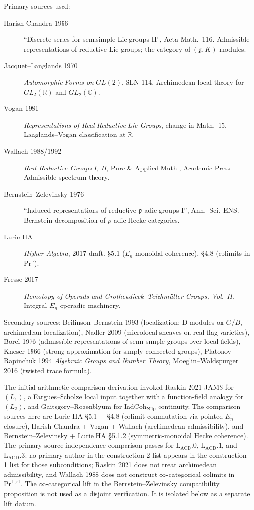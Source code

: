Primary sources used:
\begin{description}
\item[Harish-Chandra 1966] ``Discrete series for semisimple Lie
groups II'', Acta Math.\ 116. Admissible representations of
reductive Lie groups; the category of \((\mathfrak{g}, K)\)-modules.
\item[Jacquet--Langlands 1970] \emph{Automorphic Forms on \(GL(2)\)},
SLN 114. Archimedean local theory for \(GL_{2}(\mathbb{R})\) and
\(GL_{2}(\mathbb{C})\).
\item[Vogan 1981] \emph{Representations of Real Reductive Lie
Groups}, change in Math.\ 15. Langlands--Vogan classification at
\(\mathbb{R}\).
\item[Wallach 1988/1992] \emph{Real Reductive Groups I, II}, Pure
\& Applied Math., Academic Press. Admissible spectrum theory.
\item[Bernstein--Zelevinsky 1976] ``Induced representations of
reductive \(\mathfrak{p}\)-adic groups I'', Ann.\ Sci.\ ENS.
Bernstein decomposition of \(p\)-adic Hecke categories.
\item[Lurie HA] \emph{Higher Algebra}, 2017 draft. \S5.1 (\(E_{n}\)
monoidal coherence), \S4.8 (colimits in \(\mathrm{Pr}^{\mathrm{L}}\)).
\item[Fresse 2017] \emph{Homotopy of Operads and Grothendieck--Teichm\"uller
Groups, Vol.\ II}. Integral \(E_{n}\) operadic
machinery.
\end{description}

Secondary sources: Beilinson--Bernstein 1993 (localization;
D-modules on \(G/B\), archimedean localization), Nadler 2009
(microlocal sheaves on real flag varieties), Borel 1976
(admissible representations of semi-simple groups over local
fields), Kneser 1966 (strong approximation for simply-connected
groups), Platonov--Rapinchuk 1994 \emph{Algebraic Groups and
Number Theory}, Moeglin--Waldspurger 2016 (twisted trace
formula).

The initial arithmetic comparison derivation invoked Raskin 2021 JAMS for \((L_{1})\), a
Fargues--Scholze local input together with a function-field analogy for
\((L_{2})\), and Gaitsgory--Rozenblyum for
\(\mathrm{IndCoh}_{\mathrm{Nilp}}\) continuity. The comparison sources
here are Lurie HA \S5.1 +
\S4.8 (colimit commutation via pointed-\(E_{n}\) closure),
Harish-Chandra + Vogan + Wallach (archimedean admissibility), and
Bernstein--Zelevinsky + Lurie HA \S5.1.2 (symmetric-monoidal Hecke
coherence). The primary-source independence comparison passes for \(\mathrm{L}_{\mathrm{ACD}}.0\),
\(\mathrm{L}_{\mathrm{ACD}}.1\), and \(\mathrm{L}_{\mathrm{ACD}}.3\): no
primary author in the construction-2 list appears in the construction-1 list for
those subconditions; Raskin 2021 does not treat archimedean admissibility,
and Wallach 1988 does not construct \(\infty\)-categorical colimits in
\(\mathrm{Pr}^{\mathrm{L,st}}\). The \(\infty\)-categorical lift in the
Bernstein--Zelevinsky compatibility proposition is not used as a
disjoint verification. It is isolated below as a separate lift datum.

